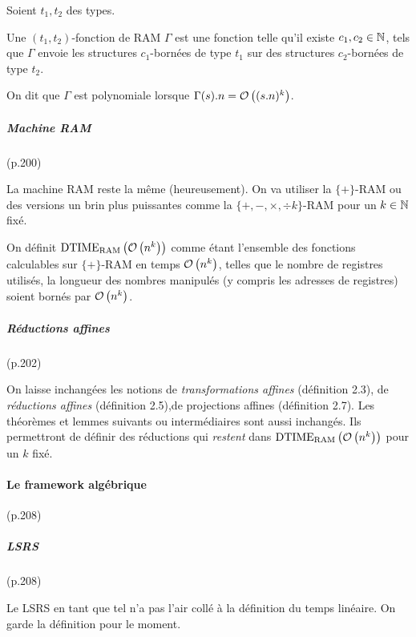 \documentclass{article}
\newcommand{\dtimeram}{\text{DTIME}_{\text{RAM}}\left( \grozo{ n^k }\right)}
\begin{document}
	
		\begin{definition}
			Soient $t_1, t_2$ des types. 
			
			Une $(t_1, t_2)$-fonction de RAM $\Gamma$ est une fonction telle qu'il existe $c_1, c_2 \in \mathbb{N}$, tels que $\Gamma$ envoie les structures $c_1$-bornées de type $t_1$ sur des structures $c_2$-bornées de type $t_2$.
			
			
			On dit que $\Gamma$ est polynomiale lorsque $\Gamma(s).n = \mathcal{O}\left( (s.n)^k \right)$.
			
		\end{definition}
	
	
	
		\subparagraph{Machine RAM} (p.200)
	
		
		La machine RAM reste la même (heureusement). On va utiliser la $\{+\}$-RAM ou des versions un brin plus puissantes comme la $\{+ , -, \times, \div k \}$-RAM pour un $k\in \mathbb{N}$ fixé.
		
		\begin{definition}
			On définit $\dtimeram$ comme étant l'ensemble des fonctions calculables sur $\{+\}$-RAM en temps $\mathcal{O}\left( n^k \right)$, telles que le nombre de registres utilisés, la longueur des nombres manipulés (y compris les adresses de registres) soient bornés par $\mathcal{O}\left( n^k \right)$.
		\end{definition}
		
		
		
		\subparagraph{Réductions affines} (p.202)


		On laisse inchangées les notions de \emph{transformations affines} (définition 2.3), de \emph{réductions affines} (définition 2.5),de projections affines (définition 2.7). Les théorèmes et lemmes suivants ou intermédiaires sont aussi inchangés. Ils permettront de définir des réductions qui \emph{restent} dans $\dtimeram$ pour un $k$ fixé.
		
		
		
	\paragraph{Le framework algébrique} (p.208)


		\subparagraph{LSRS} (p.208)
		
		
		Le LSRS en tant que tel n'a pas l'air collé à la définition du temps linéaire. On garde la définition pour le moment. 
		
\end{document}
